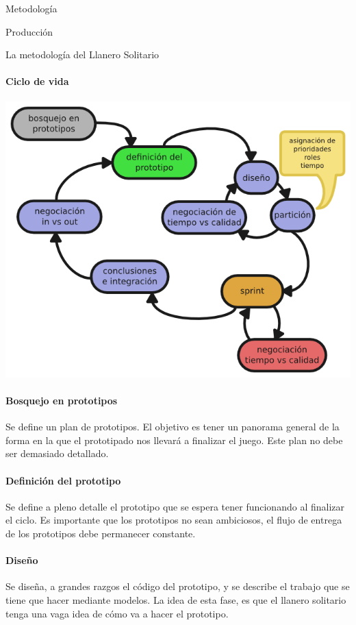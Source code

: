 \begin{section}{Metodología}
\begin{subsection}{Producción}
\begin{subsubsection}{La metodología del Llanero Solitario}
      \paragraph{Ciclo de vida}

      \begin{center}
        \includegraphics[width=.9\textwidth]{lifecycle.png}
      \end{center}

      \paragraph{Bosquejo en prototipos} Se define un plan de prototipos. El objetivo es tener un panorama general de la forma en la que el prototipado nos llevará a finalizar el juego. Este plan no debe ser demasiado detallado.

      \paragraph{Definición del prototipo} Se define a pleno detalle el prototipo que se espera tener funcionando al finalizar el ciclo. Es importante que los prototipos no sean ambiciosos, el flujo de entrega de los prototipos debe permanecer constante.

      \paragraph{Diseño} Se diseña, a grandes razgos el código del prototipo, y se describe el trabajo que se tiene que hacer mediante modelos. La idea de esta fase, es que el llanero solitario tenga una vaga idea de cómo va a hacer el prototipo.


\end{subsubsection}
\end{subsection}
\end{section}
